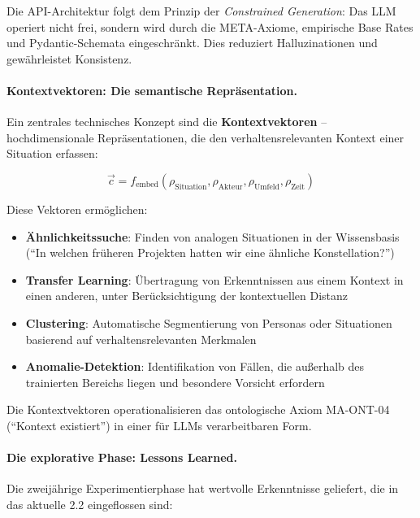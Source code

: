 Die API-Architektur folgt dem Prinzip der \textit{Constrained Generation}: Das LLM operiert nicht frei, sondern wird durch die META-Axiome, empirische Base Rates und Pydantic-Schemata eingeschränkt. Dies reduziert Halluzinationen und gewährleistet Konsistenz.

\paragraph{Kontextvektoren: Die semantische Repräsentation.}

Ein zentrales technisches Konzept sind die \textbf{Kontextvektoren} -- hochdimensionale Repräsentationen, die den verhaltensrelevanten Kontext einer Situation erfassen:

\begin{equation}
\vec{c} = f_{\text{embed}}(\rho_{\text{Situation}}, \rho_{\text{Akteur}}, \rho_{\text{Umfeld}}, \rho_{\text{Zeit}})
\end{equation}

Diese Vektoren ermöglichen:

\begin{itemize}
    \item \textbf{Ähnlichkeitssuche}: Finden von analogen Situationen in der Wissensbasis (``In welchen früheren Projekten hatten wir eine ähnliche Konstellation?'')

    \item \textbf{Transfer Learning}: Übertragung von Erkenntnissen aus einem Kontext in einen anderen, unter Berücksichtigung der kontextuellen Distanz

    \item \textbf{Clustering}: Automatische Segmentierung von Personas oder Situationen basierend auf verhaltensrelevanten Merkmalen

    \item \textbf{Anomalie-Detektion}: Identifikation von Fällen, die außerhalb des trainierten Bereichs liegen und besondere Vorsicht erfordern
\end{itemize}

Die Kontextvektoren operationalisieren das ontologische Axiom MA-ONT-04 (``Kontext existiert'') in einer für LLMs verarbeitbaren Form.

\paragraph{Die explorative Phase: Lessons Learned.}

Die zweijährige Experimentierphase hat wertvolle Erkenntnisse geliefert, die in das aktuelle \BCM{} 2.2 eingeflossen sind:

